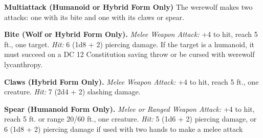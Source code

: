\documentclass[
]{article}
\begin{document}
\textbf{Multiattack (Humanoid or Hybrid Form Only)} The werewolf makes
two attacks: one with its bite and one with its claws or spear.

\textbf{Bite (Wolf or Hybrid Form Only).} \emph{Melee Weapon Attack:} +4
to hit, reach 5 ft., one target. \emph{Hit:} 6 (1d8 + 2) piercing
damage. If the target is a humanoid, it must succeed on a DC 12
Constitution saving throw or be cursed with werewolf lycanthropy.

\textbf{Claws (Hybrid Form Only).} \emph{Melee Weapon Attack:} +4 to
hit, reach 5 ft., one creature. \emph{Hit:} 7 (2d4 + 2) slashing damage.

\textbf{Spear (Humanoid Form Only).} \emph{Melee or Ranged Weapon
Attack:} +4 to hit, reach 5 ft. or range 20/60 ft., one creature.
\emph{Hit:} 5 (1d6 + 2) piercing damage, or 6 (1d8 + 2) piercing damage
if used with two hands to make a melee attack
\end{document}
